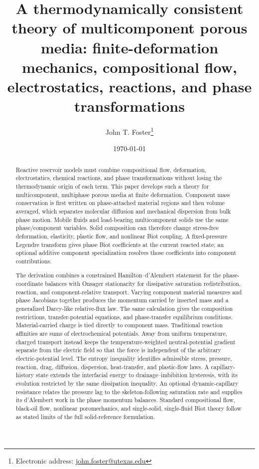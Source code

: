 \documentclass[11pt]{article}
\title{A thermodynamically consistent theory of multicomponent porous media:
finite-deformation mechanics, compositional flow, electrostatics, reactions, and phase
transformations}
\author[1,2,3]{John T. Foster\footnote{Electronic address: \href{mailto:john.foster@utexas.edu}{john.foster@utexas.edu}}}
\affil[1]{The Hildebrand Department of Petroleum \& Geosystems Engineering, The University of Texas at Austin}
\affil[2]{Department of Aerospace Engineering \& Engineering Mechanics, The University of Texas at Austin}
\affil[3]{The Oden Institute for Computational Engineering \& Science, The University of Texas at Austin}
\date{\today}
\begin{document}
\maketitle

%
\begin{abstract}
	Reactive reservoir models must combine compositional flow, deformation,
	electrostatics, chemical reactions, and phase transformations without losing
	the thermodynamic origin of each term.  This paper develops such a theory for
	multicomponent, multiphase porous media at finite deformation.  Component mass
	conservation is first written on phase-attached material regions and then
	volume averaged, which separates molecular diffusion and mechanical dispersion
	from bulk phase motion.  Mobile fluids and load-bearing multicomponent solids
	use the same phase/component variables.  Solid composition can therefore
	change stress-free deformation, elasticity, plastic flow, and nonlinear Biot
	coupling.  A fixed-pressure Legendre transform gives phase Biot coefficients
	at the current reacted state; an optional additive component specialization
	resolves those coefficients into component contributions.

	The derivation combines a constrained Hamilton--d'Alembert statement for the
	phase-coordinate balances with Onsager stationarity for dissipative saturation
	redistribution, reaction, and component-relative transport.  Varying
	component material measures and phase
	Jacobians together produces the momentum carried by inserted mass and a
	generalized Darcy-like relative-flux law.  The same calculation gives the
	composition restrictions, transfer-potential equations, and phase-transfer
	equilibrium conditions.  Material-carried charge is tied directly to component
	mass.
	Traditional reaction affinities are sums of electrochemical potentials.  Away
	from uniform temperature, charged transport instead keeps the
	temperature-weighted neutral-potential gradient separate from the electric
	field so that the force is independent of the arbitrary electric-potential
	level.  The entropy inequality identifies admissible stress, pressure,
	reaction, drag, diffusion, dispersion, heat-transfer, and plastic-flow laws.
	A capillary-history state extends the interfacial energy to
	drainage--imbibition hysteresis, with its evolution restricted by the same
	dissipation inequality.  An optional dynamic-capillary resistance relates the
	pressure lag to the skeleton-following saturation rate and supplies its
	d'Alembert work in the phase momentum balances.
	Standard compositional flow, black-oil flow, nonlinear poromechanics, and
	single-solid, single-fluid Biot theory follow as stated limits of the full
	solid-reference formulation.
\end{abstract}
%
\end{document}
